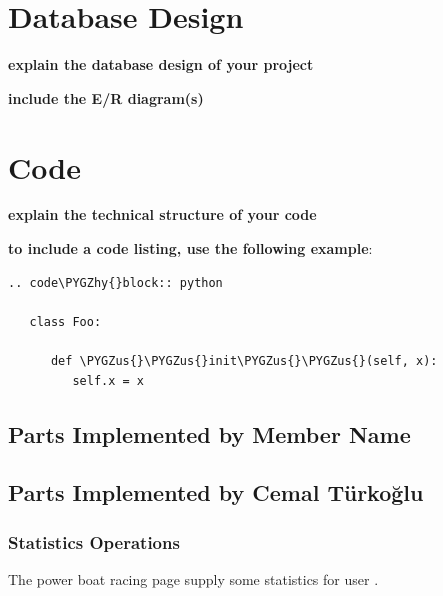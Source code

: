 \documentclass[a4paper,10pt,english]{sphinxmanual}
\def\PYGZus{\char`\_}
\def\PYGZhy{\char`\-}
\begin{document}
\section{Database Design}
\label{developer/index:database-design}
\textbf{explain the database design of your project}

\textbf{include the E/R diagram(s)}


\section{Code}
\label{developer/index:code}
\textbf{explain the technical structure of your code}

\textbf{to include a code listing, use the following example}:

\begin{Verbatim}[commandchars=\\\{\}]
.. code\PYGZhy{}block:: python

   class Foo:

      def \PYGZus{}\PYGZus{}init\PYGZus{}\PYGZus{}(self, x):
         self.x = x
\end{Verbatim}


\subsection{Parts Implemented by Member Name}
\label{developer/member1:parts-implemented-by-member-name}\label{developer/member1::doc}

\subsection{Parts Implemented by Cemal Türkoğlu}
\label{developer/member2::doc}\label{developer/member2:parts-implemented-by-cemal-turkoglu}

\subsubsection{Statistics Operations}
\label{developer/member2:statistics-operations}
The power boat racing page supply some statistics for user .
\begin{quote}

\end{quote}
\end{document}
